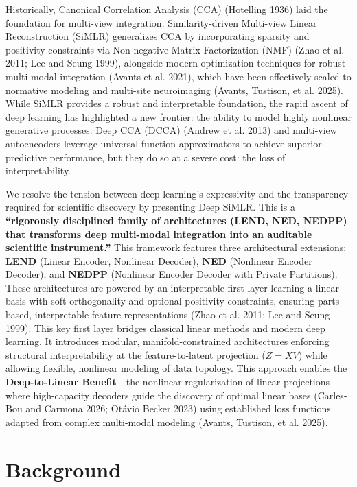 \documentclass[
  letterpaper,
]{report}
\begin{document}
Historically, Canonical Correlation Analysis (CCA) (Hotelling 1936) laid
the foundation for multi-view integration. Similarity-driven Multi-view
Linear Reconstruction (SiMLR) generalizes CCA by incorporating sparsity
and positivity constraints via Non-negative Matrix Factorization (NMF)
(Zhao et al. 2011; Lee and Seung 1999), alongside modern optimization
techniques for robust multi-modal integration (Avants et al. 2021),
which have been effectively scaled to normative modeling and multi-site
neuroimaging ({Avants, Tustison, et al.} 2025). While SiMLR provides a
robust and interpretable foundation, the rapid ascent of deep learning
has highlighted a new frontier: the ability to model highly nonlinear
generative processes. Deep CCA (DCCA) (Andrew et al. 2013) and
multi-view autoencoders leverage universal function approximators to
achieve superior predictive performance, but they do so at a severe
cost: the loss of interpretability.

We resolve the tension between deep learning's expressivity and the
transparency required for scientific discovery by presenting Deep SiMLR.
This is a \textbf{``rigorously disciplined family of architectures
(LEND, NED, NEDPP) that transforms deep multi-modal integration into an
auditable scientific instrument.''} This framework features three
architectural extensions: \textbf{LEND} (Linear Encoder, Nonlinear
Decoder), \textbf{NED} (Nonlinear Encoder Decoder), and \textbf{NEDPP}
(Nonlinear Encoder Decoder with Private Partitions). These architectures
are powered by an interpretable first layer learning a linear basis with
soft orthogonality and optional positivity constraints, ensuring
parts-based, interpretable feature representations (Zhao et al. 2011;
Lee and Seung 1999). This key first layer bridges classical linear
methods and modern deep learning. It introduces modular,
manifold-constrained architectures enforcing structural interpretability
at the feature-to-latent projection (\(Z = XV\)) while allowing
flexible, nonlinear modeling of data topology. This approach enables the
\textbf{Deep-to-Linear Benefit}---the nonlinear regularization of linear
projections---where high-capacity decoders guide the discovery of
optimal linear bases (Carles-Bou and Carmona 2026; Otávio Becker 2023)
using established loss functions adapted from complex multi-modal
modeling ({Avants, Tustison, et al.} 2025).

\section{Background}\label{background}
\end{document}

